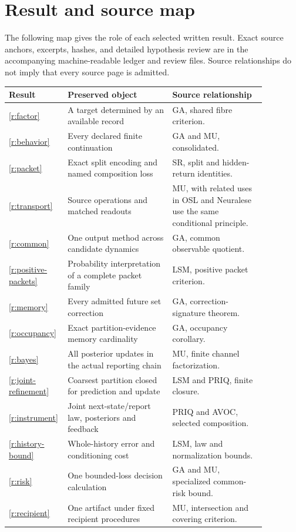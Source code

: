 
\chapter{Result and source map}\label{app:map}
The following map gives the role of each selected written result. Exact source anchors, excerpts, hashes, and detailed hypothesis review are in the accompanying machine-readable ledger and review files. Source relationships do not imply that every source page is admitted.
\small
\begin{longtable}{p{0.13\linewidth}p{0.39\linewidth}p{0.35\linewidth}}
\toprule Result & Preserved object & Source relationship\\\midrule\endhead
\ref{r:factor} & A target determined by an available record & GA, shared fibre criterion.\\
\ref{r:behavior} & Every declared finite continuation & GA and MU, consolidated.\\
\ref{r:packet} & Exact split encoding and named composition loss & SR, split and hidden-return identities.\\
\ref{r:transport} & Source operations and matched readouts & MU, with related uses in OSL and Neuralese use the same conditional principle.\\
\ref{r:common} & One output method across candidate dynamics & GA, common observable quotient.\\
\ref{r:positive-packets} & Probability interpretation of a complete packet family & LSM, positive packet criterion.\\
\ref{r:memory} & Every admitted future set correction & GA, correction-signature theorem.\\
\ref{r:occupancy} & Exact partition-evidence memory cardinality & GA, occupancy corollary.\\
\ref{r:bayes} & All posterior updates in the actual reporting chain & MU, finite channel factorization.\\
\ref{r:joint-refinement} & Coarsest partition closed for prediction and update & LSM and PRIQ, finite closure.\\
\ref{r:instrument} & Joint next-state/report law, posteriors and feedback & PRIQ and AVOC, selected composition.\\
\ref{r:history-bound} & Whole-history error and conditioning cost & LSM, law and normalization bounds.\\
\ref{r:risk} & One bounded-loss decision calculation & GA and MU, specialized common-risk bound.\\
\ref{r:recipient} & One artifact under fixed recipient procedures & MU, intersection and covering criterion.\\

\end{longtable}
